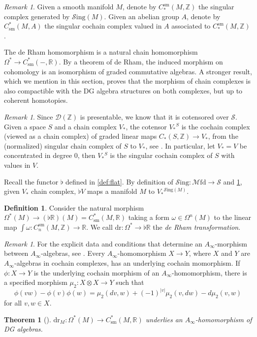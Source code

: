 \documentclass[a4paper]{book}
\newcommand{\lD}{\mathcal{D}}
\newcommand{\lM}{\mathcal{M}}
\newcommand{\bR}{\mathbb{R}}
\newcommand{\lS}{\mathcal{S}}
\newcommand{\bZ}{\mathbb{Z}}
\newcommand{\Sing}{\lS\mathrm{ing}} %
\newcommand{\Mfd}{\lM\mathrm{fd}} %
\newcommand{\sm}{\mathrm{sm}}
\newtheorem{theorem}[equation]{Theorem}
\theoremstyle{definition}
\newtheorem{definition}[equation]{Definition}
\theoremstyle{remark}
\newtheorem{remark}[equation]{Remark}
\numberwithin{equation}{section}
\begin{document}
\begin{remark}
  Given a smooth manifold $M$, denote by $C_*^\sm(M,\bZ)$ the singular complex generated by $\Sing(M)$. Given an abelian group $A$, denote by $C^*_\sm(M,A)$ the singular cochain complex valued in $A$ associated to $C_*^\sm(M,\bZ)$. 
\end{remark}
The de Rham homomorphism is a natural chain homomorphism $\Omega^*\to C_\sm^*(-,\bR)$. By a theorem of de Rham, the induced morphism on cohomology is an isomorphism of graded commutative algebras. A stronger result, which we mention in this section, proves that the morphism of chain complexes is also compactible with the DG algebra structures on both complexes, but {up to coherent homotopies}. 
\begin{remark}\label{rmk:Dcotensor}
  Since $\lD(\bZ)$ is presentable, we know that it is cotensored over $\lS$. Given a space $S$ and a chain complex $V_*$, the cotensor $V_*{}^S$ is the cochain complex (viewed as a chain complex) of graded linear maps $C_*(S,\bZ)\to V_*$, from the (normalized) singular chain complex of $S$ to $V_*$, see \cite[Definition 1.3.2.1]{lurie2017ha}. In particular, let $V_*=V$ be concentrated in degree 0, then $V_*{}^S$ is the singular cochain complex of $S$ with values in $V$. 
\end{remark}
Recall the functor $\flat$ defined in \cref{def:flat}. By definition of $\Sing:\Mfd\to\lS$ and \cref{rmk:Dcotensor}, given $V_*$ chain complex, $\flat V$ maps a manifold $M$ to $V_*{}^{\Sing(M)}$. 
\begin{definition}\label{def:derhammorf}
Consider the natural morphism $\Omega^*(M)\to (\flat\bR)(M)=C_\sm^*(M,\bR)$ taking a form $\omega\in\Omega^n(M)$ to the linear map $\int\omega:C^\sm_{n}(M,\bZ)\to\bR$. We call $\mathrm{dr}:\Omega^*\to\flat\bR$ the \emph{de Rham transformation}.  
\end{definition}
\begin{remark}\label{rmk:ainfmor}
  For the explicit data and conditions that determine an $A_\infty$-morphism between $A_\infty$-algebras, see \cite[Proposition 10.2.12]{loday2012algebraic}. Every $A_\infty$-homomorphism $X\to Y$, where $X$ and $Y$ are $A_\infty$-algebras in cochain complexes, has an underlying cochain momorphism. If $\phi:X\to Y$ is the underlying cochain morphism of an $A_\infty$-homomorphism, there is a specified morphism $\mu_2:X\otimes X\to Y$ such that $$\phi(vw)-\phi(v)\phi(w)=\mu_2(dv,w)+(-1)^{|v|}\mu_2(v,dw)-d\mu_2(v,w)$$for all $v,w\in X$. 
\end{remark}
\begin{theorem}[{\cite[Theorem 3.25]{abad2010ainftyrhamtheoremintegration}}]\label{thm:derham} 
  $\mathrm{dr}_M:\Omega^*(M)\to C^*_\sm(M,\bR)$ underlies an $A_\infty$-homomorphism of DG algebras. 
\end{theorem}
\end{document}
